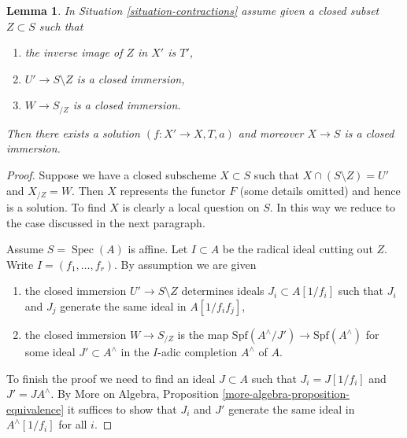 \documentclass{stacks-project}
\theoremstyle{plain}
\newtheorem{lemma}[subsection]{Lemma}
\theoremstyle{definition}
\theoremstyle{remark}
\numberwithin{equation}{subsection}
\def\Spec{\mathop{\mathrm{Spec}}}
\begin{document}
\begin{lemma}
\label{lemma-closed-immersion}
In Situation \ref{situation-contractions} assume given a closed
subset $Z \subset S$ such that
\begin{enumerate}
\item the inverse image of $Z$ in $X'$ is $T'$,
\item $U' \to S \setminus Z$ is a closed immersion,
\item $W \to S_{/Z}$ is a closed immersion.
\end{enumerate}
Then there exists a solution $(f : X' \to X, T, a)$
and moreover $X \to S$ is a closed immersion.
\end{lemma}

\begin{proof}
Suppose we have a closed subscheme $X \subset S$ such that
$X \cap (S \setminus Z) = U'$ and $X_{/Z} = W$. Then
$X$ represents the functor $F$ (some details omitted) and hence 
is a solution. To find $X$ is clearly a local question on $S$.
In this way we reduce to the case discussed in the next paragraph.

\medskip\noindent
Assume $S = \Spec(A)$ is affine. Let $I \subset A$ be the
radical ideal cutting out $Z$.
Write $I = (f_1, \ldots, f_r)$. By assumption we are given
\begin{enumerate}
\item the closed immersion $U' \to S \setminus Z$ determines
ideals $J_i \subset A[1/f_i]$ such that $J_i$ and $J_j$
generate the same ideal in $A[1/f_if_j]$,
\item the closed immersion $W \to S_{/Z}$ is the map
$\text{Spf}(A^\wedge/J') \to \text{Spf}(A^\wedge)$ for some
ideal $J' \subset A^\wedge$ in the $I$-adic completion $A^\wedge$ of $A$.
\end{enumerate}
To finish the proof we need to find an ideal $J \subset A$
such that $J_i = J[1/f_i]$ and $J' = JA^\wedge$. By
More on Algebra, Proposition \ref{more-algebra-proposition-equivalence}
it suffices to show that $J_i$ and $J'$ generate the same ideal
in $A^\wedge[1/f_i]$ for all $i$.


\end{proof}
\end{document}
